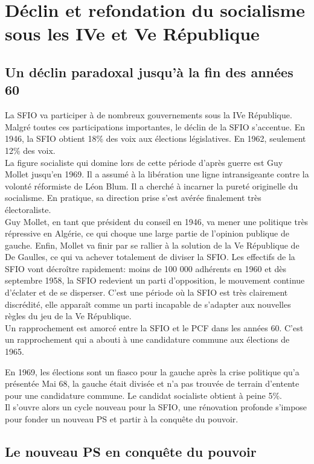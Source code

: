 \documentclass[10pt, a4paper, openany]{book}
\begin{document}
\section{Déclin et refondation du socialisme sous les IVe et Ve République}

\subsection{Un déclin paradoxal jusqu'à la fin des années 60}

La SFIO va participer à de nombreux gouvernements sous la IVe République. Malgré toutes ces participations importantes, le déclin de la SFIO s'accentue. En 1946, la SFIO obtient 18\% des voix aux élections législatives. En 1962, seulement 12\% des voix. \\
La figure socialiste qui domine lors de cette période d'après guerre est Guy Mollet jusqu'en 1969. Il a assumé à la libération une ligne intransigeante contre la volonté réformiste de Léon Blum. Il a cherché à incarner la pureté originelle du socialisme. En pratique, sa direction prise s'est avérée finalement très électoraliste. \\
Guy Mollet, en tant que président du conseil en 1946, va mener une politique très répressive en Algérie, ce qui choque une large partie de l'opinion publique de gauche. Enfin, Mollet va finir par se rallier à la solution de la Ve République de De Gaulles, ce qui va achever totalement de diviser la SFIO. Les effectifs de la SFIO vont décroître rapidement: moins de 100 000 adhérents en 1960 et dès septembre 1958, la SFIO redevient un parti d'opposition, le mouvement continue d'éclater et de se disperser. C'est une période où la SFIO est très clairement discrédité, elle apparaît comme un parti incapable de s'adapter aux nouvelles règles du jeu de la Ve République. \\
Un rapprochement est amorcé entre la SFIO et le PCF dans les années 60. C'est un rapprochement qui a abouti à une candidature commune aux élections de 1965. 


En 1969, les élections sont un fiasco pour la gauche après la crise politique qu'a présentée Mai 68, la gauche était divisée et n'a pas trouvée de terrain d'entente pour une candidature commune. Le candidat socialiste obtient à peine 5\%. \\
Il s'ouvre alors un cycle nouveau pour la SFIO, une rénovation profonde s'impose pour fonder un nouveau PS et partir à la conquête du pouvoir. 

\subsection{Le nouveau PS en conquête du pouvoir}
\end{document}
